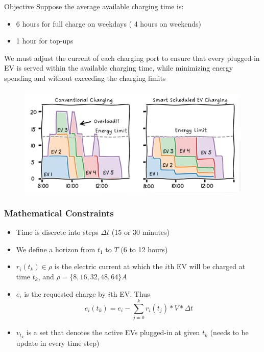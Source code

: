 \documentclass{beamer}
\begin{document}
    \begin{frame}{Objective}
       Suppose the average available charging time is:
       \begin{itemize}
        \item 6 hours for full charge on weekdays ( 4 hours on weekends)
        \item 1 hour for top-ups
       \end{itemize}
       \pause
       We must adjust the current of each charging port to ensure that every plugged-in  EV is served within the available
       charging time, while minimizing energy spending and without 
       exceeding the charging limits
       \begin{figure}
        \includegraphics[width=0.7\linewidth]{Screenshot 2023-12-18 010917.png}
        \end{figure}
    \end{frame}

    \begin{frame}
    \frametitle{Mathematical Constraints}
    \begin{itemize}
        \pause
        \item Time is discrete into steps $\Delta t$ (15 or 30 minutes)
        \pause
        \item We define a horizon from $t_1$ to $T$ (6 to 12 hours)
        \pause
        \item $r_i(t_k)\in \rho$ is  the electric current at which the $i$th EV will be charged at time $t_k$, and $\rho = \{8,16,32,48,64\}A$
        \pause
        \item $e_i$ is the requested charge by $i$th EV. Thus
        $$e_i(t_k) = e_i - \sum_{j=0}^k r_i(t_j)*V*\Delta t$$
        \pause
        \item $v_{t_k}$ is a set that denotes the active EVs plugged-in at given $t_k$ (needs to be update in every time step)
        
    \end{itemize}
    \end{frame}
\end{document}
